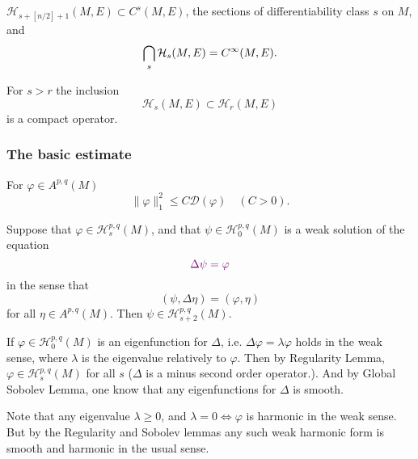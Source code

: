 \documentclass[twoside,openany,12pt]{beautynote}
\newcommand{\tmverbatim}[1]{\text{{\ttfamily{#1}}}}
\begin{document}
\begin{lemma}\label{lem:globalsobolevlem}
  $\mathcal{H}_{s + [n / 2] + 1} (M, E) \subset C^s (M, E)$, the
  sections of differentiability class $s$ on $M$, and
  \[  \bigcap_s \texttt{\tmverbatim{}} \mathcal{H}_s (M, E) = C^{\infty} (M,
     E) . \]
\end{lemma}

\begin{lemma}\label{lem:globalrellichlem}
  For $s > r$ the inclusion
  \[  \mathcal{H}_s (M, E) \subset \mathcal{H}_r (M, E) \]
  is a compact operator.
\end{lemma}

\subsubsection{ The basic estimate}

\begin{theorem}\label{thm:garding}
  For $\varphi \in A^{p, q} (M)$
  \[ \| \varphi \|_1^2 \leqslant C\mathcal{D} (\varphi) \quad  (C > 0) . \]
\end{theorem}
\begin{lemma}\label{lem:rugularitylem}
  Suppose that {\color[HTML]{800080}$\varphi \in \mathcal{H}_s^{p, q} (M)$},
  and that {\color[HTML]{800080}$\psi \in \mathcal{H}_0^{p, q} (M)$ is a weak
  solution} of the equation
  \[ {\color[HTML]{800080}\Delta \psi = \varphi} \]
  in the sense that
  \[  (\psi, \Delta \eta) = (\varphi, \eta) \]
  for all $\eta \in A^{p, q} (M)$. Then {\color[HTML]{800080}$\psi \in
  \mathcal{H}_{s + 2}^{p, q} (M)$}.
\end{lemma}

If $\varphi \in \mathcal{H}_0^{p, q} (M)$ is an eigenfunction for $\Delta$,
i.e. $\Delta \varphi = \lambda \varphi$ holds in the weak sense, where
$\lambda$ is the eigenvalue relatively to $\varphi$. Then
{\color[HTML]{B4005A}by Regularity Lemma, $\varphi \in
\mathcal{H}_s^{p, q} (M)$ for all $s$} ($\Delta$ is a minus second order
operator.). And by Global Sobolev
Lemma, one know that {\color[HTML]{B4005A}any
eigenfunctions for $\Delta$ is smooth.}

{\color[HTML]{B4005A}Note that any eigenvalue $\lambda
\geqslant 0$, and $\lambda = 0 \Longleftrightarrow \varphi$ is harmonic in the
weak sense. But by the Regularity and} Sobolev lemmas any such weak
harmonic form is smooth and harmonic in the usual sense.
\end{document}
